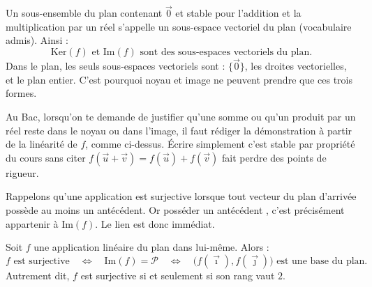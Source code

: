 \documentclass[11pt]{article}
\newcommand{\cle}[1]{{\popxbold\color{popdark}#1}}
\newcounter{popsec}
\newcounter{popsub}
\newcommand{\courssub}[1]{%
  \stepcounter{popsub}%
  \par\vspace{9pt}\noindent{\popxbold\fontsize{11.5}{13}\selectfont\color{popink}{\color{poporange}\thepopsec.\thepopsub}\hspace{6pt}#1}\par\nopagebreak\vspace{4pt}
}
\begin{document}
\begin{aretenir}
Un sous-ensemble du plan contenant $\vec{0}$ et stable pour l'addition et la multiplication par un réel s'appelle un \cle{sous-espace vectoriel} du plan (vocabulaire admis). Ainsi :
\[ \mathrm{Ker}(f) \text{ et } \mathrm{Im}(f) \text{ sont des sous-espaces vectoriels du plan.} \]
Dans le plan, les seuls sous-espaces vectoriels sont : $\{\vec{0}\}$, les droites vectorielles, et le plan entier. C'est pourquoi noyau et image ne peuvent prendre que ces trois formes.
\end{aretenir}

\begin{attention}
Au Bac, lorsqu'on te demande de justifier qu'une somme ou qu'un produit par un réel reste dans le noyau ou dans l'image, il faut rédiger la démonstration à partir de la linéarité de $f$, comme ci-dessus. Écrire simplement \og c'est stable par propriété du cours \fg{} sans citer $f(\vec{u}+\vec{v}) = f(\vec{u}) + f(\vec{v})$ fait perdre des points de rigueur.
\end{attention}

\courssub{Image et surjectivité}

Rappelons qu'une application est \cle{surjective} lorsque tout vecteur du plan d'arrivée possède au moins un antécédent. Or \og posséder un antécédent \fg{}, c'est précisément appartenir à $\mathrm{Im}(f)$. Le lien est donc immédiat.

\begin{propriete}
Soit $f$ une application linéaire du plan dans lui-même. Alors :
\[ f \text{ est surjective} \quad \Longleftrightarrow \quad \mathrm{Im}(f) = \mathcal{P} \quad \Longleftrightarrow \quad \bigl(f(\vec{\imath}), f(\vec{\jmath})\bigr) \text{ est une base du plan.} \]
Autrement dit, $f$ est surjective si et seulement si son rang vaut $2$.
\end{propriete}
\end{document}
